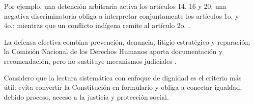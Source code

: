 \documentclass[
	spanish,
	letterpaper, oneside
]{article}
\begin{document}
Por ejemplo, una detención arbitraria activa los artículos 14, 16 y 20; una negativa discriminatoria obliga a interpretar conjuntamente los artículos 1o. y 4o.; mientras que un conflicto indígena remite al artículo 2o. \citep{constitucionCPEUM2026}.

La defensa efectiva combina prevención, denuncia, litigio estratégico y reparación; la Comisión Nacional de los Derechos Humanos aporta documentación y recomendación, pero no sustituye mecanismos judiciales \citep{cndhMarcoNormativo}.

Considero que la lectura sistemática con enfoque de dignidad es el criterio más útil: evita convertir la Constitución en formulario y obliga a conectar igualdad, debido proceso, acceso a la justicia y protección social.

\clearpage
\pagestyle{empty}
\end{document}

